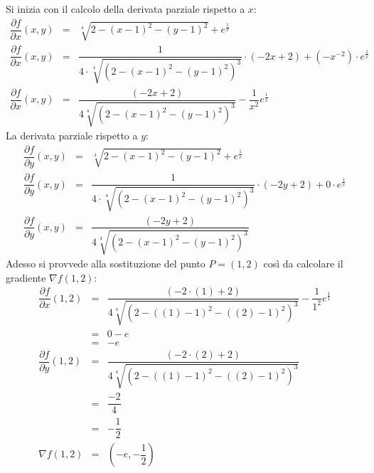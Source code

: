 \documentclass[a4paper]{article}
\begin{document}
	\noindent
	Si inizia con il calcolo della derivata parziale rispetto a $x$:
	\begin{equation*}
		\begin{array}{lcl}
			\dfrac{\partial f}{\partial x}\left(x,y\right) &=& \sqrt[4]{2 - \left(x-1\right)^{2} - \left(y-1\right)^{2}} + e^{\frac{1}{x}} \\ [1em]
			\dfrac{\partial f}{\partial x}\left(x,y\right) &=& \dfrac{1}{4 \cdot \sqrt[4]{\left(2-\left(x-1\right)^{2}-\left(y-1\right)^{2}\right)^{3}}} \cdot \left(-2x + 2\right) + \left(-x^{-2}\right) \cdot e^{\frac{1}{x}} \\ [2.5em]
			\dfrac{\partial f}{\partial x}\left(x,y\right) &=& \dfrac{\left(-2x+2\right)}{4\sqrt[4]{\left(2-\left(x-1\right)^{2}-\left(y-1\right)^{2}\right)^{3}}} - \dfrac{1}{x^{2}} e^{\frac{1}{x}}
		\end{array}
	\end{equation*}
	La derivata parziale rispetto a $y$:
	\begin{equation*}
		\begin{array}{lcl}
			\dfrac{\partial f}{\partial y}\left(x,y\right) &=& \sqrt[4]{2 - \left(x-1\right)^{2} - \left(y-1\right)^{2}} + e^{\frac{1}{x}} \\ [1em]
			\dfrac{\partial f}{\partial y}\left(x,y\right) &=& \dfrac{1}{4 \cdot \sqrt[4]{\left(2-\left(x-1\right)^{2}-\left(y-1\right)^{2}\right)^{3}}} \cdot \left(-2y + 2\right) + 0 \cdot e^{\frac{1}{x}} \\ [2.5em]
			\dfrac{\partial f}{\partial y}\left(x,y\right) &=& \dfrac{\left(-2y+2\right)}{4\sqrt[4]{\left(2-\left(x-1\right)^{2}-\left(y-1\right)^{2}\right)^{3}}}
		\end{array}
	\end{equation*}
	Adesso si provvede alla sostituzione del punto $P=\left(1,2\right)$ così da calcolare il gradiente $\nabla f\left(1,2\right)$:
	\begin{equation*}
		\begin{array}{lcl}
			\dfrac{\partial f}{\partial x}\left(1,2\right) &=& \dfrac{\left(-2 \cdot \left(1\right) +2\right)}{4\sqrt[4]{\left(2 -\left(\left(1\right)-1\right)^{2}-\left(\left(2\right)-1\right)^{2}\right)^{3}}} - \dfrac{1}{1^{2}} e^{\frac{1}{1}} \\ [2.5em]
			&=& 0 - e \\
			&=& -e \\ [1em]
			\dfrac{\partial f}{\partial y}\left(1,2\right) &=& \dfrac{\left(-2 \cdot \left(2\right) +2\right)}{4\sqrt[4]{\left(2 -\left(\left(1\right)-1\right)^{2}-\left(\left(2\right)-1\right)^{2}\right)^{3}}} \\ [2.5em]
			&=& \dfrac{-2}{4} \\ [.8em]
			&=& -\dfrac{1}{2} \\ [1em]
			\nabla f \left(1,2\right) &=& \left(-e, -\dfrac{1}{2}\right)
		\end{array}
	\end{equation*}
\end{document}
